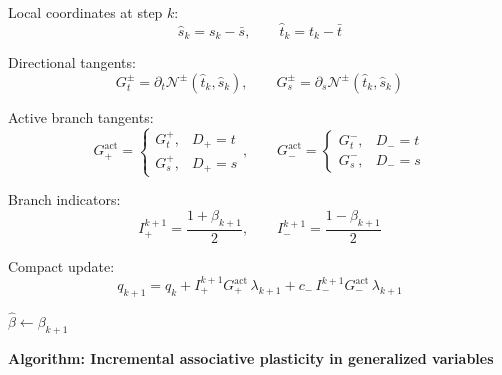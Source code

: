 \documentclass[11pt,a4paper]{article}
\begin{document}
\begin{algorithm}[H]
\begin{algorithmic}[1]
    \State Local coordinates at step $k$:
    \[
    \hat s_k=s_k-\bar s,\qquad
    \hat t_k=t_k-\bar t
    \]

    \State Directional tangents:
    \[
    G_t^\pm=\partial_t\mathcal N^\pm(\hat t_k,\hat s_k),\qquad
    G_s^\pm=\partial_s\mathcal N^\pm(\hat t_k,\hat s_k)
    \]

    \State Active branch tangents:
    \[
    G_+^{\mathrm{act}}=
    \begin{cases}
    G_t^+, & D_+=t\\
    G_s^+, & D_+=s
    \end{cases},
    \qquad
    G_-^{\mathrm{act}}=
    \begin{cases}
    G_t^-, & D_-=t\\
    G_s^-, & D_-=s
    \end{cases}
    \]

    \State Branch indicators:
    \[
    I_+^{k+1}=\frac{1+\beta_{k+1}}{2},\qquad
    I_-^{k+1}=\frac{1-\beta_{k+1}}{2}
    \]

    \State Compact update:
    \[
    q_{k+1}
    =
    q_k
    +
    I_+^{k+1}G_+^{\mathrm{act}}\,\lambda_{k+1}
    +
    c_-\,I_-^{k+1}G_-^{\mathrm{act}}\,\lambda_{k+1}
    \]

    \State $\hat\beta\gets\beta_{k+1}$
\EndFor

\end{algorithmic}
\end{algorithm}



\newpage
\noindent\textbf{Algorithm: Incremental associative plasticity in generalized variables}
\end{document}
